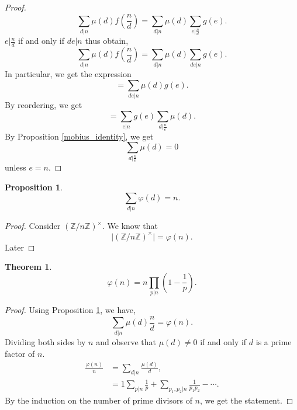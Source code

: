 \documentclass{article}
\newtheorem{theorem}{Theorem} [section]
\newtheorem{proposition}{Proposition}[section]
\newcommand{\Z}[0]{\mathbb{Z}}
\begin{document}
\begin{proof}
  \begin{equation*}
    \sum_{d|n}\mu(d)f\left({\frac n d}\right) = \sum_{d|n}\mu(d)\sum_{e|{\frac n d}} g(e).
  \end{equation*}
  $e|{\frac n d}$ if and only if $de|n$ thus obtain, 
  \begin{equation*}
    \sum_{d|n}\mu(d)f\left({\frac n d}\right) = \sum_{d|n}\mu(d)\sum_{de|n} g(e).
  \end{equation*}
  In particular, we get the expression 
  \begin{equation*}
    =\sum_{de|n}\mu(d)g(e).
  \end{equation*}
  By reordering, we get 
  \begin{equation*}
    =\sum_{e|n}g(e)\sum_{d|{\frac n e}}\mu(d).
  \end{equation*}
  By Proposition \ref{mobius_identity}, we get
  \begin{equation*}
    \sum_{d|{\frac n e}}\mu(d) = 0
  \end{equation*}
  unless $e = n$.
\end{proof}

\begin{proposition}
  \begin{equation*}
    \sum_{d|n}\varphi(d) = n.
  \end{equation*}
  \label{mobius_inversion_euler_phi}
\end{proposition}

\begin{proof}
  Consider $(\Z/n\Z)^\times$. We know that 
  \begin{equation*}
    \vert(\Z/n\Z)^\times\vert = \varphi(n). 
  \end{equation*}
  Later%
\end{proof}

\begin{theorem}
  \begin{equation*}
    \varphi(n) = n\prod_{p|n}\left(1-{\frac 1 p}\right).
  \end{equation*}
\end{theorem}

\begin{proof}
  Using Proposition \ref{mobius_inversion_euler_phi}, we have,
  \begin{equation*}
    \sum_{d|n} \mu(d){\frac n d} = \varphi(n).
  \end{equation*}
  Dividing both sides by $n$ and observe that $\mu(d)\not=0$ if and only if $d$ is a prime factor of $n$.
  \begin{align*}
    {\frac {\varphi(n)} n} & = \sum_{d|n}{\frac {\mu(d)} d},\\
    & = 1 \sum_{p|n}{\frac 1 p}+ \sum_{p_1,p_2|n}{\frac 1 {p_1p_2}}-\cdots.
  \end{align*}
  By the induction on the number of prime divisors of $n$, we get the statement.
\end{proof}
\end{document}
